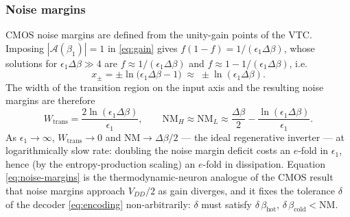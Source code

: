 \documentclass[11pt,a4paper]{article}
\theoremstyle{definition}
\theoremstyle{remark}
\begin{document}
\subsubsection{Noise margins}
CMOS noise margins are defined from the unity-gain points of the VTC.
Imposing $|\mathcal{A}(\beta_1)| = 1$ in \eqref{eq:gain} gives
$f(1-f) = 1/(\epsilon_1\Delta\beta)$, whose solutions for
$\epsilon_1\Delta\beta \gg 4$ are
$f \approx 1/(\epsilon_1\Delta\beta)$ and
$f \approx 1 - 1/(\epsilon_1\Delta\beta)$, i.e.
\begin{equation}
x_{\pm} = \pm \ln\!\big(\epsilon_1\Delta\beta - 1\big)
\;\approx\; \pm\ln(\epsilon_1\Delta\beta).
\end{equation}
The width of the transition region on the input axis and the resulting
noise margins are therefore
\begin{equation}
W_{\mathrm{trans}}
= \frac{2\ln(\epsilon_1\Delta\beta)}{\epsilon_1},
\qquad
\mathrm{NM}_{H} \approx \mathrm{NM}_{L}
\approx \frac{\Delta\beta}{2}
- \frac{\ln(\epsilon_1\Delta\beta)}{\epsilon_1}.
\label{eq:noise-margins}
\end{equation}
As $\epsilon_1\to\infty$, $W_{\mathrm{trans}}\to 0$ and
$\mathrm{NM}\to\Delta\beta/2$ --- the ideal regenerative inverter ---
at logarithmically slow rate: doubling the noise margin deficit costs
an $e$-fold in $\epsilon_1$, hence (by the entropy-production scaling)
an $e$-fold in dissipation. Equation \eqref{eq:noise-margins} is the
thermodynamic-neuron analogue of the CMOS result that noise margins
approach $V_{DD}/2$ as gain diverges, and it fixes the tolerance
$\delta$ of the decoder \eqref{eq:encoding} non-arbitrarily:
$\delta$ must satisfy
$\delta\,\beta_{\mathrm{hot}},\,\delta\,\beta_{\mathrm{cold}}
< \mathrm{NM}$.
 
\end{document}
